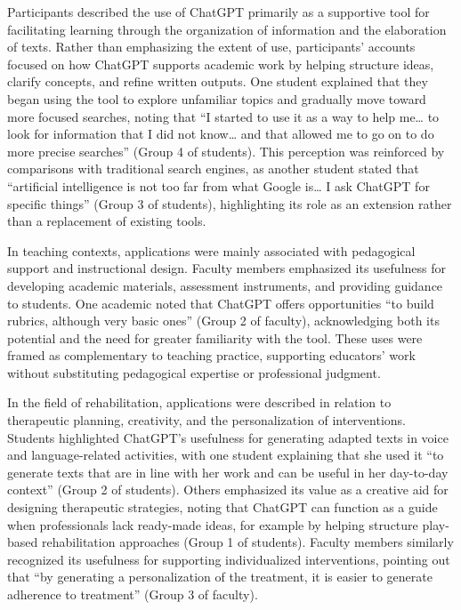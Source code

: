 \documentclass[english]{textolivre}
\begin{document}
Participants described the use of ChatGPT primarily as a supportive tool for facilitating learning through the organization of information and the elaboration of texts. Rather than emphasizing the extent of use, participants’ accounts focused on how ChatGPT supports academic work by helping structure ideas, clarify concepts, and refine written outputs. One student explained that they began using the tool to explore unfamiliar topics and gradually move toward more focused searches, noting that “I started to use it as a way to help me… to look for information that I did not know… and that allowed me to go on to do more precise searches” (Group 4 of students). This perception was reinforced by comparisons with traditional search engines, as another student stated that “artificial intelligence is not too far from what Google is… I ask ChatGPT for specific things” (Group 3 of students), highlighting its role as an extension rather than a replacement of existing tools.

In teaching contexts, applications were mainly associated with pedagogical support and instructional design. Faculty members emphasized its usefulness for developing academic materials, assessment instruments, and providing guidance to students. One academic noted that ChatGPT offers opportunities “to build rubrics, although very basic ones” (Group 2 of faculty), acknowledging both its potential and the need for greater familiarity with the tool. These uses were framed as complementary to teaching practice, supporting educators’ work without substituting pedagogical expertise or professional judgment.

In the field of rehabilitation, applications were described in relation to therapeutic planning, creativity, and the personalization of interventions. Students highlighted ChatGPT’s usefulness for generating adapted texts in voice and language-related activities, with one student explaining that she used it “to generate texts that are in line with her work and can be useful in her day-to-day context” (Group 2 of students). Others emphasized its value as a creative aid for designing therapeutic strategies, noting that ChatGPT can function as a guide when professionals lack ready-made ideas, for example by helping structure play-based rehabilitation approaches (Group 1 of students). Faculty members similarly recognized its usefulness for supporting individualized interventions, pointing out that “by generating a personalization of the treatment, it is easier to generate adherence to treatment” (Group 3 of faculty).
\end{document}
